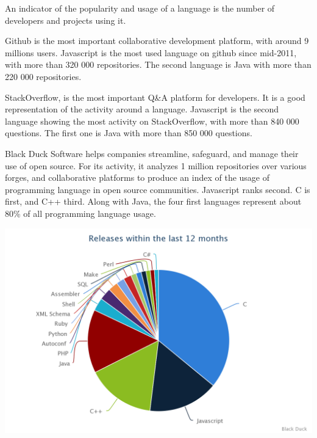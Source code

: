 An indicator of the popularity and usage of a language is the number of developers and projects using it.

Github is the most important collaborative development platform, with around 9 millions users.
Javascript is the most used language on github since mid-2011, with more than 320 000 repositories.
The second language is Java with more than 220 000 repositories.


StackOverflow, is the most important Q\&A platform for developers.
It is a good representation of the activity around a language.
Javascript is the second language showing the most activity on StackOverflow, with more than 840 000 questions.
The first one is Java with more than 850 000 questions.

Black Duck Software helps companies streamline, safeguard, and manage their use of open source.
For its activity, it analyzes 1 million repositories over various forges, and collaborative platforms to produce an index of the usage of programming language in open source communities.
Javascript ranks second.
C is first, and C++ third.
Along with Java, the four first languages represent about 80\% of all programming language usage.

\includegraphics[width=0.9\linewidth]{../../data/js-trends/black-duck-15}


